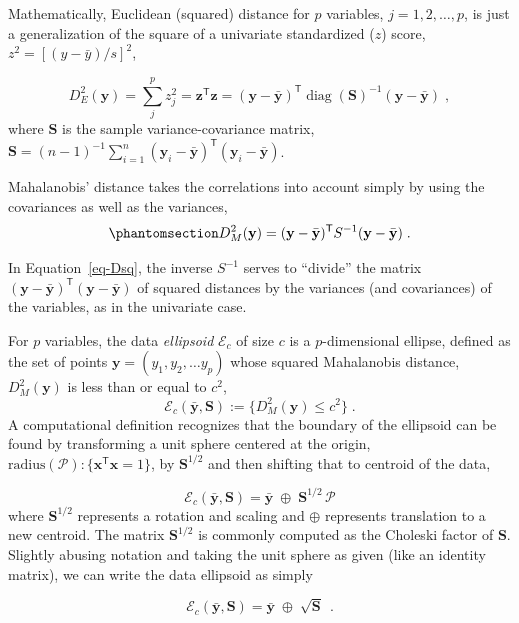 \documentclass[
  letterpaper,
  10pt,
  krantz2]{krantz}
\begin{document}
Mathematically, Euclidean (squared) distance for \(p\) variables,
\(j = 1, 2, \dots , p\), is just a generalization of the square of a
univariate standardized (\(z\)) score, \(z^2 = [(y - \bar{y}) / s]^2\),

\[
D_E^2 (\mathbf{y}) = \sum_j^p z_j^2 = \mathbf{z}^\textsf{T}  \mathbf{z} = (\mathbf{y} - \bar{\mathbf{y}})^\textsf{T} \operatorname{diag}(\mathbf{S})^{-1} (\mathbf{y} - \bar{\mathbf{y}}) \; ,
\] where \(\mathbf{S}\) is the sample variance-covariance matrix,
\(\mathbf{S} = ({n-1})^{-1} \sum_{i=1}^n (\mathbf{y}_i - \bar{\mathbf{y}})^\textsf{T} (\mathbf{y}_i - \bar{\mathbf{y}})\).

Mahalanobis' distance takes the correlations into account simply by
using the covariances as well as the variances,
\begin{equation}\phantomsection\label{eq-Dsq}{
D_M^2 (\mathbf{y}) = (\mathbf{y} - \bar{\mathbf{y}})^\mathsf{T} S^{-1} (\mathbf{y} - \bar{\mathbf{y}}) \; .
}\end{equation}

In Equation~\ref{eq-Dsq}, the inverse \(S^{-1}\) serves to ``divide''
the matrix
\((\mathbf{y} - \bar{\mathbf{y}})^\mathsf{T} (\mathbf{y} - \bar{\mathbf{y}})\)
of squared distances by the variances (and covariances) of the
variables, as in the univariate case.

For \(p\) variables, the data \emph{ellipsoid} \(\mathcal{E}_c\) of size
\(c\) is a \(p\)-dimensional ellipse, defined as the set of points
\(\mathbf{y} = (y_1, y_2, \dots y_p)\) whose squared Mahalanobis
distance, \(D_M^2 ( \mathbf{y} )\) is less than or equal to \(c^2\), \[
\mathcal{E}_c (\bar{\mathbf{y}}, \mathbf{S}) := \{ D_M^2 (\mathbf{y}) \le c^2 \} \; .
\] A computational definition recognizes that the boundary of the
ellipsoid can be found by transforming a unit sphere centered at the
origin,
\(\text{radius}(\mathcal{P}) : \{ \mathbf{x}^\textsf{T} \mathbf{x}= 1\}\),
by \(\mathbf{S}^{1/2}\) and then shifting that to centroid of the data,

\[
\mathcal{E}_c (\bar{\mathbf{y}}, \mathbf{S}) = \bar{\mathbf{y}} \; \oplus \; \mathbf{S}^{1/2} \, \mathcal{P} 
\] where \(\mathbf{S}^{1/2}\) represents a rotation and scaling and
\(\oplus\) represents translation to a new centroid. The matrix
\(\mathbf{S}^{1/2}\) is commonly computed as the Choleski factor of
\(\mathbf{S}\). Slightly abusing notation and taking the unit sphere as
given (like an identity matrix), we can write the data ellipsoid as
simply

\[
\mathcal{E}_c (\bar{\mathbf{y}}, \mathbf{S}) = \bar{\mathbf{y}} \; \oplus \; \sqrt{\mathbf{S}} \:\: .
\]
\end{document}
